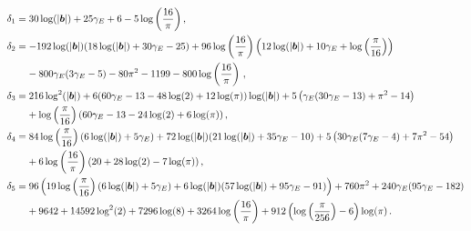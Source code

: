 \begin{align}
    \begin{split}
        &\delta_1=30 \log(|\boldsymbol{b}|)+25 \gamma_E +6-5 \log \left(\frac{16}{\pi }\right),\\ &
        \delta_2=-192 \log(|\boldsymbol{b}|) (18 \log(|\boldsymbol{b}|)+30 \gamma_E -25)+96 \log \left(\frac{16}{\pi }\right) \left(12 \log(|\boldsymbol{b}|)+10 \gamma_E +\log \left(\frac{\pi }{16}\right)\right)\\ &\hspace{0.7 cm}-800 \gamma_E  (3 \gamma_E -5)-80 \pi ^2-1199-800 \log \left(\frac{16}{\pi }\right)\,,\\ &
        \delta_3=216 \log ^2(|\boldsymbol{b}|)+6 (60 \gamma_E -13-48 \log (2)+12 \log (\pi )) \log(|\boldsymbol{b}|)+5 \left(\gamma_E  (30 \gamma_E -13)+\pi ^2-14\right)\\ &
        \hspace{0.7 cm}+\log \left(\frac{\pi }{16}\right) (60 \gamma_E -13-24 \log (2)+6 \log (\pi ))\,,\\ &
        \delta_4=84 \log \left(\frac{\pi }{16}\right) (6 \log(|\boldsymbol{b}|)+5 \gamma_E )+72 \log(|\boldsymbol{b}|) (21 \log(|\boldsymbol{b}|)+35 \gamma_E -10)+5 \left(30 \gamma_E  (7 \gamma_E -4)+7 \pi ^2-54\right)\\ &\hspace{0.7 cm}+6 \log \left(\frac{16}{\pi }\right) (20+28 \log (2)-7 \log (\pi ))\,,\\ &
        \delta_5=96 \left(19 \log \left(\frac{\pi }{16}\right) (6 \log(|\boldsymbol{b}|)+5 \gamma_E )+6 \log(|\boldsymbol{b}|) (57 \log(|\boldsymbol{b}|)+95 \gamma_E -91)\right)+760 \pi ^2+240 \gamma_E  (95 \gamma_E -182)\\ &\hspace{0.7 cm}+9642+14592 \log ^2(2)+7296 \log (8)+3264 \log \left(\frac{16}{\pi }\right)+912 \left(\log \left(\frac{\pi }{256}\right)-6\right) \log (\pi )\,.
    \end{split}
\end{align}
